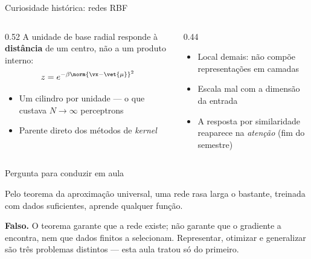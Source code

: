 \documentclass[aspectratio=169, 11pt]{beamer}
\begin{document}
\begin{frame}{Curiosidade histórica: redes RBF}

  \begin{columns}[T]
    \begin{column}{0.52\textwidth}
      A unidade de base radial responde à \textbf{distância} de um centro,
      não a um produto interno:
      \[
        z = e^{-\beta \norm{\vx - \vet{\mu}}^2}
      \]
      \begin{itemize}\setlength{\itemsep}{0.2ex}
        \item Um cilindro por unidade — o que custava $N \to \infty$
              perceptrons
        \item Parente direto dos métodos de \emph{kernel}
      \end{itemize}
    \end{column}
    \begin{column}{0.44\textwidth}
      \begin{tcolorbox}[iccaixa=icCinza, title={Por que ficou para trás}]
        \begin{itemize}\setlength{\itemsep}{0.2ex}
          \item Local demais: não compõe representações em camadas
          \item Escala mal com a dimensão da entrada
          \item A resposta por similaridade reaparece na \emph{atenção}
                (fim do semestre)
        \end{itemize}
      \end{tcolorbox}
    \end{column}
  \end{columns}
\end{frame}

\begin{frame}{Pergunta para conduzir em aula}

  \begin{quizbox}
    Pelo teorema da aproximação universal, uma rede rasa larga o bastante,
    treinada com dados suficientes, aprende qualquer função.

    \smallskip
  \end{quizbox}

  \pause

  \begin{respbox}
    \textbf{Falso.} O teorema garante que a rede existe; não garante que o
    gradiente a encontra, nem que dados finitos a selecionam. Representar,
    otimizar e generalizar são três problemas distintos — esta aula tratou
    só do primeiro.
  \end{respbox}
\end{frame}
\end{document}
